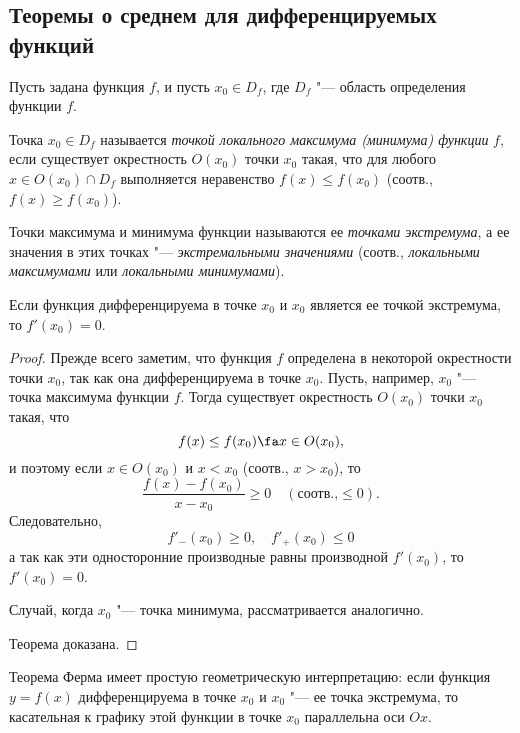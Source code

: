 \subsection{Теоремы о среднем для дифференцируемых функций}
Пусть задана функция $f$, и пусть $x_0 \in D_f$, где $D_f$ "--- область определения функции $f$.
\begin{defn}
Точка $x_0 \in D_f$ называется \textit{точкой локального максимума (минимума) функции} $f$, если существует окрестность $O(x_0)$ точки $x_0$ такая, что для любого $x \in O(x_0)\cap D_f$ выполняется неравенство $f(x) \le f(x_0)$ (соотв., $f(x) \ge f(x_0)$).
\end{defn}
\begin{defn} Точки максимума и минимума функции называются ее \textit{точками экстремума}, а ее значения в этих точках "--- \textit{экстремальными значениями} (соотв., \textit{локальными максимумами} или \textit{локальными минимумами}).
\end{defn}
\begin{thm}\label{ch4n1} 
Если функция дифференцируема в точке $x_0$ и $x_0$ является ее точкой экстремума, то $f'(x_0) = 0$.
\end{thm}
\begin{proof}
Прежде всего заметим, что функция $f$ определена в некоторой окрестности точки $x_0$, так как она дифференцируема в точке $x_0$. Пусть, например, $x_0$ "--- точка максимума функции $f$. Тогда существует окрестность $O(x_0)$ точки $x_0$ такая, что 
$$
f(x) \le f(x_0) \fa x \in O(x_0),
$$
и поэтому если $x \in O(x_0)$ и $x < x_0$ (соотв., $x > x_0$), то
$$
\frac{f(x)-f(x_0)}{x-x_0}\ge0\quad (\text{соотв.,} \le 0).
$$
Следовательно,
$$
f'_{-}(x_0)\ge 0, \quad f'_{+}(x_0)\le 0
$$
а так как эти односторонние производные равны производной $f'(x_0)$,
то $f'(x_0) = 0$. 

Случай, когда $x_0$ "--- точка минимума, рассматривается аналогично. 

Теорема доказана.
\end{proof}

Теорема Ферма имеет простую геометрическую интерпретацию:	если функция $y = f(x)$ дифференцируема в точке $x_0$ и $x_0$ "--- ее точка экстремума, то касательная к графику этой функции в точке $x_0$ параллельна оси $Ox$. 

